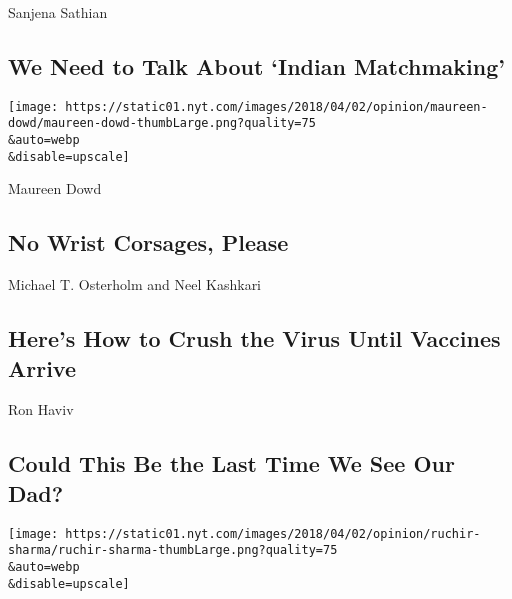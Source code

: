 \href{/2020/08/05/opinion/sunday/indian-matchmaking-netflix.html}{}

Sanjena Sathian

\hypertarget{we-need-to-talk-about-indian-matchmaking}{%
\subsection{We Need to Talk About `Indian
Matchmaking'}\label{we-need-to-talk-about-indian-matchmaking}}

\href{/2020/08/08/opinion/sunday/biden-vice-president-geraldine-ferraro.html}{}

\texttt{[image: https://static01.nyt.com/images/2018/04/02/opinion/maureen-dowd/maureen-dowd-thumbLarge.png?quality=75\\\&auto=webp\\\&disable=upscale]}

Maureen Dowd

\hypertarget{no-wrist-corsages-please}{%
\subsection{No Wrist Corsages, Please}\label{no-wrist-corsages-please}}

\href{/2020/08/07/opinion/coronavirus-lockdown-unemployment-death.html}{}

Michael T. Osterholm and Neel Kashkari

\hypertarget{heres-how-to-crush-the-virus-until-vaccines-arrive}{%
\subsection{Here's How to Crush the Virus Until Vaccines
Arrive}\label{heres-how-to-crush-the-virus-until-vaccines-arrive}}

\href{/2020/08/06/opinion/sunday/coronavirus-baruch-haviv-death.html}{}

Ron Haviv

\hypertarget{could-this-be-the-last-time-we-see-our-dad}{%
\subsection{Could This Be the Last Time We See Our
Dad?}\label{could-this-be-the-last-time-we-see-our-dad}}

\href{/2020/08/08/opinion/gold-investment-coronavirus.html}{}

\texttt{[image: https://static01.nyt.com/images/2018/04/02/opinion/ruchir-sharma/ruchir-sharma-thumbLarge.png?quality=75\\\&auto=webp\\\&disable=upscale]}

